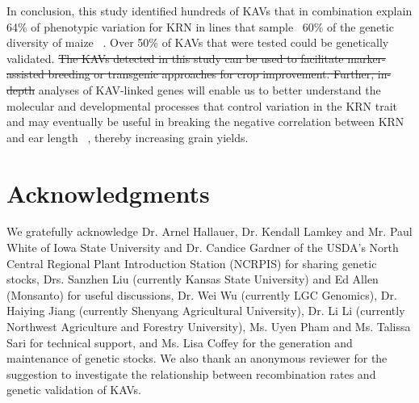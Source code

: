 \documentclass[10pt,letterpaper]{article}
\providecommand{\DIFaddtex}[1]{{\protect\color{blue}\uwave{#1}}} %
\providecommand{\DIFdeltex}[1]{{\protect\color{red}\sout{#1}}}                      %
\providecommand{\DIFaddbegin}{} %
\providecommand{\DIFaddend}{} %
\providecommand{\DIFdelbegin}{} %
\providecommand{\DIFdelend}{} %
\providecommand{\DIFadd}[1]{\texorpdfstring{\DIFaddtex{#1}}{#1}} %
\providecommand{\DIFdel}[1]{\texorpdfstring{\DIFdeltex{#1}}{}} %
\begin{document}
In conclusion, this study identified hundreds of KAVs that in combination explain 64\% of phenotypic variation for KRN in lines that sample ~60\% of the genetic diversity of maize ~\cite{Liu2003}. Over 50\% of KAVs that were tested could be genetically validated. \DIFdelbegin \DIFdel{The KAVs detected in this study can be used to facilitate marker-assisted breeding or transgenic approaches for crop improvement. Further, in-depth }\DIFdelend \DIFaddbegin \DIFadd{In-depth }\DIFaddend analyses of KAV-linked genes will enable us to better understand the molecular and developmental processes that control variation in the KRN trait and may eventually be useful in breaking the negative correlation between KRN and ear length ~\cite{Hallauer2004}, thereby increasing grain yields.





\section*{Acknowledgments}
We gratefully acknowledge Dr. Arnel Hallauer, Dr. Kendall Lamkey and Mr. Paul White of Iowa State University and Dr. Candice Gardner of the USDA’s North Central Regional Plant Introduction Station (NCRPIS) for sharing genetic stocks, Drs. Sanzhen Liu (currently Kansas State University) and Ed Allen (Monsanto) for useful discussions, Dr. Wei Wu (currently LGC Genomics), Dr. Haiying Jiang (currently Shenyang Agricultural University), Dr. Li Li (currently Northwest Agriculture and Forestry University), Ms. Uyen Pham and Ms. Talissa Sari for technical support, and Ms. Lisa Coffey for the generation and maintenance of genetic stocks.  We also thank an anonymous reviewer for the suggestion to investigate the relationship between recombination rates and genetic validation of KAVs.


\nolinenumbers
\end{document}

